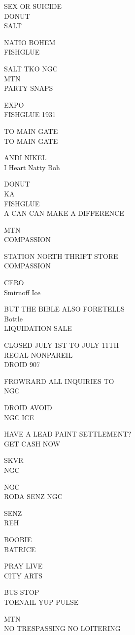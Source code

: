 \documentclass[10pt,letterpaper]{article}
\begin{document}
SEX OR SUICIDE\\
DONUT\\
SALT

NATIO BOHEM\\
FISHGLUE

SALT TKO NGC\\
MTN\\
PARTY SNAPS

EXPO\\
FISHGLUE 1931

TO MAIN GATE\\
TO MAIN GATE

ANDI NIKEL\\
I Heart Natty Boh

DONUT\\
KA\\
FISHGLUE\\
A CAN CAN MAKE A DIFFERENCE

MTN\\
COMPASSION

STATION NORTH THRIFT STORE\\
COMPASSION

CERO\\
Smirnoff Ice

BUT THE BIBLE ALSO FORETELLS\\
Bottle\\
LIQUIDATION SALE

CLOSED JULY 1ST TO JULY 11TH\\
REGAL NONPAREIL\\
DROID 907

FROWRARD ALL INQUIRIES TO\\
NGC

DROID AVOID\\
NGC ICE

HAVE A LEAD PAINT SETTLEMENT?\\
GET CASH NOW

SKVR\\
NGC

NGC\\
RODA SENZ NGC

SENZ\\
REH

BOOBIE\\
BATRICE

PRAY LIVE\\
CITY ARTS

BUS STOP\\
TOENAIL YUP PULSE

MTN\\
NO TRESPASSING NO LOITERING
\end{document}
